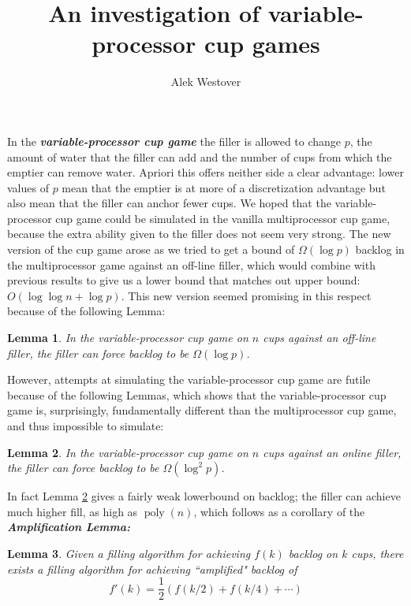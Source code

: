 \documentclass{article}[11pt]
\title{An investigation of variable-processor cup games}
\author{Alek Westover}
\newcommand{\defn}[1]{{\textit{\textbf{\boldmath #1}}}}
\DeclareMathOperator{\poly}{\text{poly}}
\newtheorem{lemma}{Lemma}
\begin{document}
\maketitle

In the \defn{variable-processor cup game} the filler is allowed to change
$p$, the amount of water that the filler can add and the number of cups from
which the emptier can remove water.  Apriori this offers neither side a clear
advantage: lower values of $p$ mean that the emptier is at more of a
discretization advantage but also mean that the filler can anchor fewer cups.
We hoped that the variable-processor cup game could be simulated in the vanilla
multiprocessor cup game, because the extra ability given to the filler does not
seem very strong. The new version of the cup game arose as we tried to get a bound 
of $\Omega(\log p)$ backlog in the multiprocessor game against an off-line filler, 
which would combine with previous results to give us a lower bound that matches
out upper bound: $O(\log\log n + \log p)$. This new version seemed promising in
this respect because of the following Lemma:

\begin{lemma}
  \label{lem:dprand}
  In the variable-processor cup game on $n$ cups against an 
  off-line filler, the filler can force backlog to be $\Omega(\log p)$.
\end{lemma}

However, attempts at simulating the variable-processor cup game are futile
because of the following Lemmas, which shows that the variable-processor cup
game is, surprisingly, fundamentally different than the multiprocessor cup game,
and thus impossible to simulate:

\begin{lemma}
  \label{lem:dpdet}
  In the variable-processor cup game on $n$ cups against an online filler, the
  filler can force backlog to be $\Omega(\log^2 p)$.
\end{lemma}

In fact Lemma \ref{lem:dpdet} gives a fairly weak lowerbound on backlog; the
filler can achieve much higher fill, as high as $\poly(n)$, which follows as a
corollary of the \defn{Amplification Lemma:}

\begin{lemma}
  \label{lem:amplification}
  Given a filling algorithm for achieving $f(k)$ backlog on $k$ cups, there
  exists a filling algorithm for achieving ``amplified" backlog of
  $$f'(k) = \frac{1}{2}(f(k/2) + f(k/4) + \cdots )$$
\end{lemma}
\end{document}
